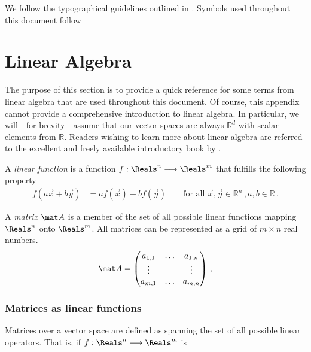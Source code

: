 We follow the typographical guidelines outlined in .
Symbols used throughout this document follow 

\section{Linear Algebra}
\label{app:linear_algebra}

The purpose of this section is to provide a quick reference for some terms from linear algebra that are used throughout this document.
Of course, this appendix cannot provide a comprehensive introduction to linear algebra.
In particular, we will---for brevity---assume that our vector spaces are always $\mathbb{R}^d$ with scalar elements from $\mathbb{R}$.
Readers wishing to learn more about linear algebra are referred to the excellent and freely available introductory book by \citet{hefferon2020linear}.

\begin{definition}
A \emph{linear function} is a function $f : \Reals^n \longrightarrow \Reals^{m}$ that fulfills the following property
\begin{align*}
	f(a \vec x + b \vec y) &= a f(\vec x) + b f(\vec y) \quad \quad \text{for all } \vec x, \vec y \in \mathbb{R}^n\,, a, b \in \mathbb{R} \,.
\end{align*}
\end{definition}

\begin{definition}[Matrix]
A \emph{matrix} $\mat A$ is a member of the set of all possible linear functions mapping $\Reals^n$ onto $\Reals^m$.
All matrices can be represented as a grid of $m \times n$ real numbers.
\begin{align*}
	\mat A = \begin{pmatrix}
		a_{1, 1} & \ldots & a_{1, n} \\
		\vdots & & \vdots \\
		a_{m, 1} & \ldots & a_{m, n}
	\end{pmatrix} \,,
\end{align*}
\end{definition}

\subsubsection{Matrices as linear functions}
Matrices over a vector space are defined as spanning the set of all possible linear operators.
That is, if $f : \Reals^n \longrightarrow \Reals^m$ is 

